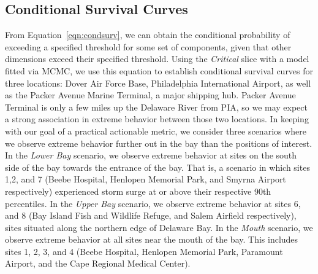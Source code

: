 \subsection{Conditional Survival Curves}
From Equation~\ref{eqn:condsurv}, we can obtain the conditional probability of
    exceeding a specified threshold for some set of components, given that other dimensions exceed their specified 
    threshold. Using the \emph{Critical} slice with a model fitted via MCMC, we use this equation to establish 
    conditional survival curves for three locations: Dover Air Force Base, Philadelphia International Airport, 
    as well as the Packer Avenue Marine Terminal, a major shipping hub.  Packer Avenue Terminal is only a few 
    miles up the Delaware River from PIA, so we may expect a strong association in extreme behavior between 
    those two locations. In keeping with our goal of a practical actionable metric, we 
    consider three scenarios where we observe extreme behavior further out in the bay than the positions of
    interest.  In the \emph{Lower Bay} scenario, we observe extreme behavior at sites on the south side of the 
    bay towards the entrance of the bay.  That is, a scenario in which sites 1,2, and 7 (Beebe Hospital, 
    Henlopen Memorial Park, and Smyrna Airport respectively) experienced storm surge at or above their
    respective 90th percentiles.  In the \emph{Upper Bay} scenario, we observe extreme behavior at sites 6,
    and 8 (Bay Island Fish and Wildlife Refuge, and Salem Airfield respectively), sites situated along the
    northern edge of Delaware Bay.  In the \emph{Mouth} scenario, we observe extreme behavior at all sites near
    the mouth of the bay.  This includes sites 1, 2, 3, and 4 (Beebe Hospital, Henlopen Memorial Park, 
    Paramount Airport, and the Cape Regional Medical Center). 

